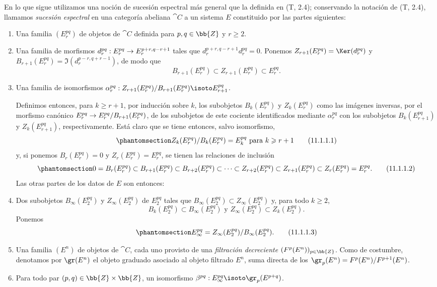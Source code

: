 \documentclass[oneside]{amsart}
\makeatletter
\renewcommand{\geq}{\geqslant}
\newcommand{\ega@arrow}[2]{\mathchoice{#1}{#2}{#2}{#2}}
\renewcommand{\to}{\ega@arrow{\longrightarrow}{\rightarrow}}
\newcommand{\oldpage}[2][]{{\marginnote{\normalfont\textbf{#1}~|~#2}}\ignorespaces}
\let\EGAOriginalLabel\label
\renewcommand{\label}[1]{\phantomsection\EGAOriginalLabel{#1}}
\makeatother
\begin{document}
\begin{env}[11.1.1]
\label{0.11.1.1}
En lo que sigue utilizamos una noción de sucesión espectral más general que la definida en (T, 2.4); conservando la notación de (T, 2.4), llamamos \emph{sucesión espectral} en una categoría abeliana $\cat{C}$ a un sistema $E$ constituido por las partes siguientes:
\begin{enumerate}
  \item[\textit{(a)}] Una familia $(E_r^{pq})$ de objetos de $\cat{C}$ definida para $p,q\in\bb{Z}$ y $r\geq 2$.
  \item[\textit{(b)}] Una familia de morfismos $d_r^{pq}:E_r^{pq}\to E_r^{p+r,q-r+1}$ tales que $d_r^{p+r,q-r+1}d_r^{pq}=0$.
    Ponemos $Z_{r+1}(E_r^{pq})=\Ker(d_r^{pq})$ y $B_{r+1}(E_r^{pq})=\Im(d_r^{p-r,q+r-1})$, de modo que
    \[
      B_{r+1}(E_r^{pq})\subset Z_{r+1}(E_r^{pq})\subset E_r^{pq}.
    \]
  \item[\textit{(c)}] Una familia de isomorfismos $\alpha_r^{pq}:Z_{r+1}(E_r^{pq})/B_{r+1}(E_r^{pq})\isoto E_{r+1}^{pq}$.

  Definimos entonces, para $k\geq r+1$, por inducción sobre $k$, los subobjetos $B_k(E_r^{pq})$ y $Z_k(E_r^{pq})$ como las imágenes inversas, por el morfismo canónico $E_r^{pq}\to E_r^{pq}/B_{r+1}(E_r^{pq})$, de los subobjetos de este cociente identificados mediante $\alpha_r^{pq}$ con los subobjetos $B_k(E_{r+1}^{pq})$ y $Z_k(E_{r+1}^{pq})$, respectivamente.
Está claro que se tiene entonces, salvo isomorfismo,
  \[
  \label{0.11.1.1.1}
    Z_k(E_r^{pq})/B_k(E_r^{pq})=E_k^{pq}\text{ para }k\geq r+1
    \tag{11.1.1.1}
  \]
  y, si ponemos $B_r(E_r^{pq})=0$ y $Z_r(E_r^{pq})=E_r^{pq}$, se tienen las relaciones de inclusión
  \[
  \label{0.11.1.1.2}
    0=B_r(E_r^{pq})\subset B_{r+1}(E_r^{pq})\subset B_{r+2}(E_r^{pq})\subset\cdots\subset Z_{r+2}(E_r^{pq})\subset Z_{r+1}(E_r^{pq})\subset Z_r(E_r^{pq})=E_r^{pq}.
    \tag{11.1.1.2}
  \]
  Las otras partes de los datos de $E$ son entonces:
  \item[\textit{(d)}] Dos subobjetos $B_\infty(E_2^{pq})$ y $Z_\infty(E_2^{pq})$ de $E_2^{pq}$ tales que $B_\infty(E_2^{pq})\subset Z_\infty(E_2^{pq})$ y, para todo $k\geq 2$,
    \[
      B_k(E_2^{pq})\subset B_\infty(E_2^{pq})\text{ y }Z_\infty(E_2^{pq})\subset Z_k(E_2^{pq}).
    \]
    Ponemos
    \[
    \label{0.11.1.1.3}
      E_\infty^{pq}=Z_\infty(E_2^{pq})/B_\infty(E_2^{pq}).
      \tag{11.1.1.3}
    \]
  \item[\textit{(e)}]
\oldpage[0\textsubscript{III}]{24}
    Una familia $(E^n)$ de objetos de $\cat{C}$, cada uno provisto de una \emph{filtración decreciente $(F^p(E^n))_{p\in\bb{Z}}$}.
    Como de costumbre, denotamos por $\gr(E^n)$ el objeto graduado asociado al objeto filtrado $E^n$, suma directa de los $\gr_p(E^n)=F^p(E^n)/F^{p+1}(E^n)$.
  \item[\textit{(f)}] Para todo par $(p,q)\in\bb{Z}\times\bb{Z}$, un isomorfismo $\beta^{pq}:E_\infty^{pq}\isoto\gr_p(E^{p+q})$.
\end{enumerate}


\end{env}
\end{document}
